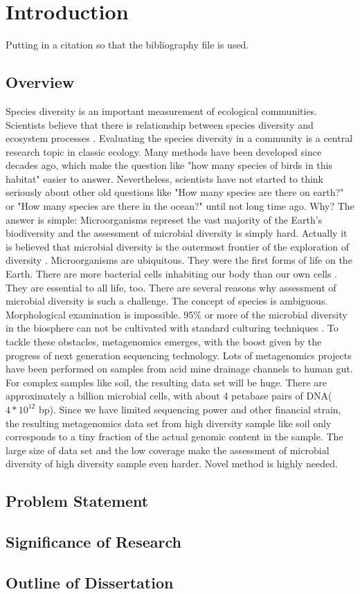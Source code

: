 \chapter{Introduction}
Putting in a citation so that the bibliography file is used\cite{ex}.

\section{Overview}
Species diversity is an important measurement of ecological communities. Scientists 
believe that there is relationship between species diversity and ecosystem processes \cite{Loreau:2001aa}. Evaluating the species diversity in a community is a central research topic 
in classic ecology. Many methods have been developed since decades ago, which make the 
question like "how many species of birds in this habitat" easier to answer. 
Nevertheless, scientists have not started to think seriously about other old questions like 
"How many species are there on earth?" \cite{May:1988aa} or "How many species are there in the ocean?" \cite{Mora:2011aa} until
not long time ago.
Why? The answer is simple: Microorganisms represet the vast majority of the Earth's biodiversity
and the assessment of microbial diversity is simply hard. Actually it is believed that 
microbial diversity is the outermost frontier of the exploration of diversity \cite{magurran2011biological}.
Microorganisms are ubiquitous. They were the first forms of life on the Earth. 
There are more bacterial cells inhabiting our body than our own cells \cite{Savage:1977aa}.
They are essential to all life, too. There are several reasons why assessment of microbial diversity
is such a challenge. The concept of species is ambiguous. Morphological examination is impossible.
95\% or more of the microbial diversity in the biosphere can not be cultivated with standard 
culturing techniques \cite{Curtis:2002aa}. To tackle these obstacles, metagenomics emerges, with
 the boost given by the progress of next generation sequencing technology. Lots of metagenomics 
 projects have been performed on samples from acid mine drainage channels to human gut. For 
 complex samples like soil, the resulting data set will be huge. There are approximately a billion 
 microbial cells, with about 4 petabase pairs of DNA($4*{10}^{12}$ bp). Since we have limited
 sequencing power and other financial strain, the resulting metagenomics data set from 
 high diversity sample like soil only corresponds to a tiny fraction of the actual genomic
 content in the sample. The large size of data set and the low coverage make the assessment of microbial 
 diversity of high diversity sample even harder. Novel method is highly needed. 

\section{Problem Statement}

\section{Significance of Research}

\section{Outline of Dissertation}


